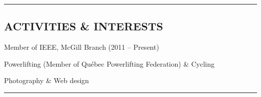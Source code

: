 \documentclass[10pt,letterpaper]{article}
\newenvironment{indentsection}[1]%
{\begin{list}{}%
	{\setlength{\leftmargin}{#1}}%
	\item[]%
}
{\end{list}}
\begin{document}
\hrule
\vspace{-0.4em}
\subsection*{ACTIVITIES \& INTERESTS}

\begin{indentsection}{\parindent}
\begin{description*}
        \item[]Member of IEEE, McGill Branch (2011 -- Present)
        \item[]Powerlifting (Member of Qu\'{e}bec Powerlifting Federation) \& Cycling
        \item[]Photography \& Web design
\end{description*}
\end{indentsection}

\hrule
\vspace{-0.4em}
\end{document}
